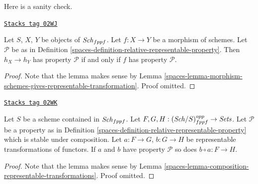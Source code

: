 Here is a sanity check.

\begin{lemma}
\label{spaces-lemma-morphism-schemes-gives-representable-transformation-property}
\href{https://stacks.math.columbia.edu/tag/02WJ}{\texttt{Stacks tag 02WJ}}

Let $S$, $X$, $Y$ be objects of $\mathit{Sch}_{fppf}$.
Let $f : X \to Y$ be a morphism of schemes.
Let $\mathcal{P}$ be as in
Definition \ref{spaces-definition-relative-representable-property}.
Then $h_X \longrightarrow h_Y$ has property $\mathcal{P}$ if
and only if $f$ has property $\mathcal{P}$.
\end{lemma}

\begin{proof}

Note that the lemma makes sense by
Lemma \ref{spaces-lemma-morphism-schemes-gives-representable-transformation}.
Proof omitted.
\end{proof}

\begin{lemma}
\label{spaces-lemma-composition-representable-transformations-property}
\href{https://stacks.math.columbia.edu/tag/02WK}{\texttt{Stacks tag 02WK}}

Let $S$ be a scheme contained in $\mathit{Sch}_{fppf}$.
Let $F, G, H : (\mathit{Sch}/S)_{fppf}^{opp} \to \textit{Sets}$.
Let $\mathcal{P}$ be a property as in
Definition \ref{spaces-definition-relative-representable-property}
which is stable under composition.
Let $a : F \to G$, $b : G \to H$ be representable transformations of functors.
If $a$ and $b$ have property $\mathcal{P}$ so does
$b \circ a : F \longrightarrow H$.
\end{lemma}

\begin{proof}

Note that the lemma makes sense by
Lemma \ref{spaces-lemma-composition-representable-transformations}.
Proof omitted.
\end{proof}

